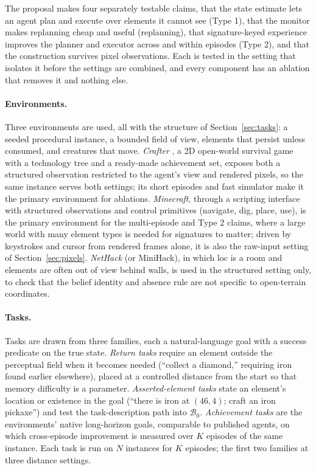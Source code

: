\documentclass[10pt]{article}
\newcommand{\calB}{\mathcal{B}}
\newcommand{\loc}{\mathrm{loc}}
\begin{document}
The proposal makes four separately testable claims, that the state estimate lets an agent plan and execute over elements it cannot see (Type 1), that the monitor makes replanning cheap and useful (replanning), that signature-keyed experience improves the planner and executor across and within episodes (Type 2), and that the construction survives pixel observations. Each is tested in the setting that isolates it before the settings are combined, and every component has an ablation that removes it and nothing else.

\paragraph{Environments.}\label{sec:eval-env}
Three environments are used, all with the structure of Section~\ref{sec:tasks}: a seeded procedural instance, a bounded field of view, elements that persist unless consumed, and creatures that move. \emph{Crafter} \cite{hafner2022crafter}, a 2D open-world survival game with a technology tree and a ready-made achievement set, exposes both a structured observation restricted to the agent's view and rendered pixels, so the same instance serves both settings; its short episodes and fast simulator make it the primary environment for ablations. \emph{Minecraft}, through a scripting interface with structured observations and control primitives (navigate, dig, place, use), is the primary environment for the multi-episode and Type 2 claims, where a large world with many element types is needed for signatures to matter; driven by keystrokes and cursor from rendered frames alone, it is also the raw-input setting of Section~\ref{sec:pixels}. \emph{NetHack} \cite{kuttler2020nethack} (or MiniHack), in which $\loc$ is a room and elements are often out of view behind walls, is used in the structured setting only, to check that the belief identity and absence rule are not specific to open-terrain coordinates.

\paragraph{Tasks.}
Tasks are drawn from three families, each a natural-language goal with a success predicate on the true state. \emph{Return tasks} require an element outside the perceptual field when it becomes needed (``collect a diamond,'' requiring iron found earlier elsewhere), placed at a controlled distance from the start so that memory difficulty is a parameter. \emph{Asserted-element tasks} state an element's location or existence in the goal (``there is iron at $(46,4)$; craft an iron pickaxe'') and test the task-description path into $\calB_0$. \emph{Achievement tasks} are the environments' native long-horizon goals, comparable to published agents, on which cross-episode improvement is measured over $K$ episodes of the same instance. Each task is run on $N$ instances for $K$ episodes; the first two families at three distance settings.
\end{document}

